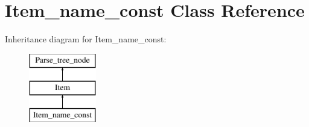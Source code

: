 \hypertarget{classItem__name__const}{}\section{Item\+\_\+name\+\_\+const Class Reference}
\label{classItem__name__const}
Inheritance diagram for Item\+\_\+name\+\_\+const\+:\begin{figure}[H]
\begin{center}
\leavevmode
\includegraphics[height=3.000000cm]{classItem__name__const}
\end{center}
\end{figure}
